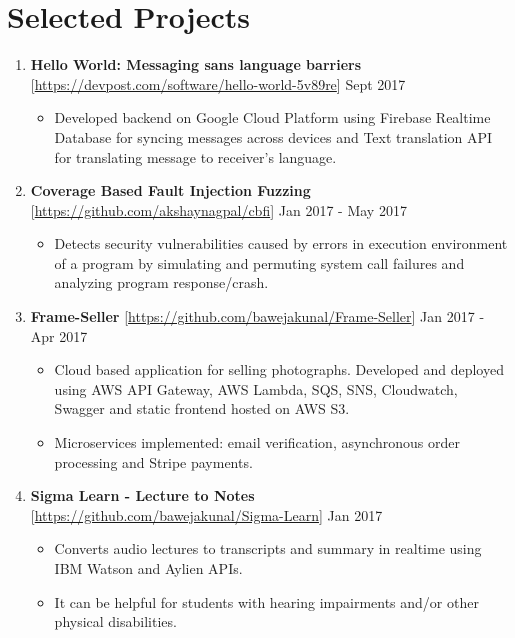 \documentclass{article}
\newcommand{\bi}{\vspace{-1mm}\begin{itemize}[align=left,leftmargin=*, rightmargin=80pt, labelindent=0pt,labelsep=2pt, label={-}, nosep]}
\newcommand{\ei}{\end{itemize}}
\begin{document}
\vspace{-2mm}
\section*{Selected Projects}
\begin{enumerate}

    \item \textbf{Hello World: Messaging sans language barriers} [\href{https://devpost.com/software/hello-world-5v89re}{https://devpost.com/software/hello-world-5v89re}] {\hfill Sept 2017}
    \bi
        \item Developed backend on Google Cloud Platform using Firebase Realtime Database for syncing messages across devices and Text translation API for translating message to receiver's language.
    \ei

    \item \textbf{Coverage Based Fault Injection Fuzzing} [\href{https://github.com/akshaynagpal/cbfi}{https://github.com/akshaynagpal/cbfi}] {\hfill Jan 2017 - May 2017}
    \bi
        \item Detects security vulnerabilities caused by errors in execution environment of a program by simulating and permuting system call failures and analyzing program response/crash.
    \ei

    \item \textbf{Frame-Seller} [\href{https://github.com/bawejakunal/Frame-Seller}{https://github.com/bawejakunal/Frame-Seller}] {\hfill Jan 2017 - Apr 2017}
    \bi
        \item Cloud based application for selling photographs. Developed and deployed using AWS API Gateway, AWS Lambda, SQS, SNS, Cloudwatch, Swagger and static frontend hosted on AWS S3.

        \item Microservices implemented: email verification, asynchronous order processing and Stripe payments.
    \ei

    \item \textbf{Sigma Learn - Lecture to Notes} [\href{https://github.com/bawejakunal/Sigma-Learn}{https://github.com/bawejakunal/Sigma-Learn}] {\hfill Jan 2017}
    \bi
        \item Converts audio lectures to transcripts and summary in realtime using IBM Watson and Aylien APIs.
        
        \item It can be helpful for students with hearing impairments and/or other physical disabilities.
    \ei


\end{enumerate}
\end{document}
